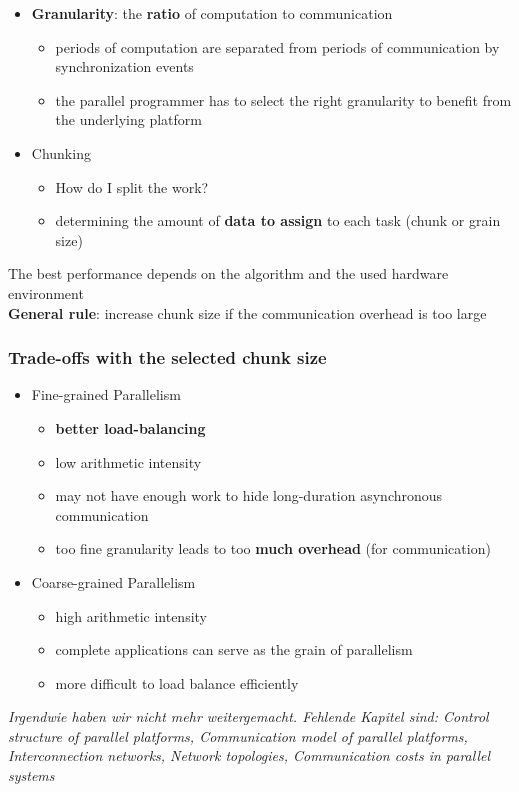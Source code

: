 \begin{itemize}
\tightlist
\item
  \textbf{Granularity}: the \textbf{ratio} of computation to
  communication

  \begin{itemize}
  \tightlist
  \item
    periods of computation are separated from periods of communication
    by synchronization events
  \item
    the parallel programmer has to select the right granularity to
    benefit from the underlying platform
  \end{itemize}
\item
  Chunking

  \begin{itemize}
  \tightlist
  \item
    How do I split the work?
  \item
    determining the amount of \textbf{data to assign} to each task
    (chunk or grain size)
  \end{itemize}
\end{itemize}

\begin{tcolorbox}[colback=red!5!white,colframe=red!75!black]
The best performance depends on the algorithm and the used hardware environment \\
\textbf{General rule}: increase chunk size if the communication overhead is too large
\end{tcolorbox}

\hypertarget{trade-offs-with-the-selected-chunk-size}{%
\subsubsection{Trade-offs with the selected chunk
size}\label{trade-offs-with-the-selected-chunk-size}}

\begin{itemize}
\tightlist
\item
  Fine-grained Parallelism

  \begin{itemize}
  \tightlist
  \item
    \textbf{better load-balancing}
  \item
    low arithmetic intensity
  \item
    may not have enough work to hide long-duration asynchronous
    communication
  \item
    too fine granularity leads to too \textbf{much overhead} (for
    communication)
  \end{itemize}
\item
  Coarse-grained Parallelism

  \begin{itemize}
  \tightlist
  \item
    high arithmetic intensity
  \item
    complete applications can serve as the grain of parallelism
  \item
    more difficult to load balance efficiently
  \end{itemize}
\end{itemize}

\textit{Irgendwie haben wir nicht mehr weitergemacht. Fehlende Kapitel sind: Control structure of parallel platforms, Communication model of parallel platforms,  Interconnection networks, Network topologies, Communication costs in parallel systems}

\clearpage